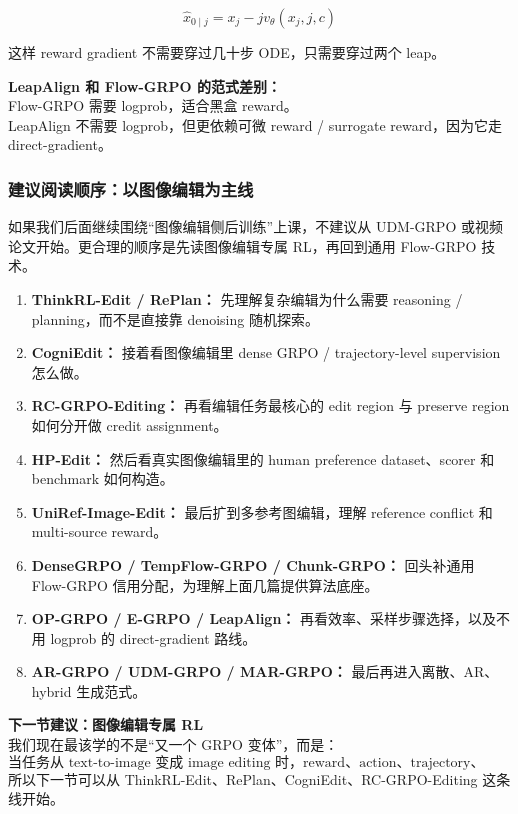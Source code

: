 \[
\hat{x}_{0\mid j}
=
x_j-jv_\theta(x_j,j,c)
\]

这样 reward gradient 不需要穿过几十步 ODE，只需要穿过两个 leap。

\begin{warnbox}
\textbf{LeapAlign 和 Flow-GRPO 的范式差别：}\\
Flow-GRPO 需要 logprob，适合黑盒 reward。\\
LeapAlign 不需要 logprob，但更依赖可微 reward / surrogate reward，因为它走 direct-gradient。
\end{warnbox}

\subsubsection{建议阅读顺序：以图像编辑为主线}

如果我们后面继续围绕“图像编辑侧后训练”上课，不建议从 UDM-GRPO 或视频论文开始。更合理的顺序是先读图像编辑专属 RL，再回到通用 Flow-GRPO 技术。

\begin{enumerate}[leftmargin=1.5em]
  \item \textbf{ThinkRL-Edit / RePlan：} 先理解复杂编辑为什么需要 reasoning / planning，而不是直接靠 denoising 随机探索。
  \item \textbf{CogniEdit：} 接着看图像编辑里 dense GRPO / trajectory-level supervision 怎么做。
  \item \textbf{RC-GRPO-Editing：} 再看编辑任务最核心的 edit region 与 preserve region 如何分开做 credit assignment。
  \item \textbf{HP-Edit：} 然后看真实图像编辑里的 human preference dataset、scorer 和 benchmark 如何构造。
  \item \textbf{UniRef-Image-Edit：} 最后扩到多参考图编辑，理解 reference conflict 和 multi-source reward。
  \item \textbf{DenseGRPO / TempFlow-GRPO / Chunk-GRPO：} 回头补通用 Flow-GRPO 信用分配，为理解上面几篇提供算法底座。
  \item \textbf{OP-GRPO / E-GRPO / LeapAlign：} 再看效率、采样步骤选择，以及不用 logprob 的 direct-gradient 路线。
  \item \textbf{AR-GRPO / UDM-GRPO / MAR-GRPO：} 最后再进入离散、AR、hybrid 生成范式。
\end{enumerate}

\begin{summarybox}
\textbf{下一节建议：图像编辑专属 RL}\\
我们现在最该学的不是“又一个 GRPO 变体”，而是：
\[
\text{当任务从 text-to-image 变成 image editing 时，reward、action、trajectory、credit assignment 分别要怎么改？}
\]
所以下一节可以从 ThinkRL-Edit、RePlan、CogniEdit、RC-GRPO-Editing 这条线开始。
\end{summarybox}

